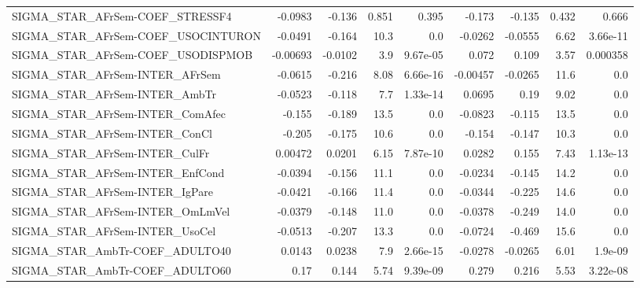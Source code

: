 \begin{tabular}{lrrrrrrrr}
SIGMA\_STAR\_AFrSem-COEF\_STRESSF4       &     -0.0983 &       -0.136 &    0.851 &    0.395 &     -0.173 &      -0.135 &        0.432 &         0.666 \\
SIGMA\_STAR\_AFrSem-COEF\_USOCINTURON    &     -0.0491 &       -0.164 &     10.3 &      0.0 &    -0.0262 &     -0.0555 &         6.62 &      3.66e-11 \\
SIGMA\_STAR\_AFrSem-COEF\_USODISPMOB     &    -0.00693 &      -0.0102 &      3.9 & 9.67e-05 &      0.072 &       0.109 &         3.57 &      0.000358 \\
SIGMA\_STAR\_AFrSem-INTER\_AFrSem        &     -0.0615 &       -0.216 &     8.08 & 6.66e-16 &   -0.00457 &     -0.0265 &         11.6 &           0.0 \\
SIGMA\_STAR\_AFrSem-INTER\_AmbTr         &     -0.0523 &       -0.118 &      7.7 & 1.33e-14 &     0.0695 &        0.19 &         9.02 &           0.0 \\
SIGMA\_STAR\_AFrSem-INTER\_ComAfec       &      -0.155 &       -0.189 &     13.5 &      0.0 &    -0.0823 &      -0.115 &         13.5 &           0.0 \\
SIGMA\_STAR\_AFrSem-INTER\_ConCl         &      -0.205 &       -0.175 &     10.6 &      0.0 &     -0.154 &      -0.147 &         10.3 &           0.0 \\
SIGMA\_STAR\_AFrSem-INTER\_CulFr         &     0.00472 &       0.0201 &     6.15 & 7.87e-10 &     0.0282 &       0.155 &         7.43 &      1.13e-13 \\
SIGMA\_STAR\_AFrSem-INTER\_EnfCond       &     -0.0394 &       -0.156 &     11.1 &      0.0 &    -0.0234 &      -0.145 &         14.2 &           0.0 \\
SIGMA\_STAR\_AFrSem-INTER\_IgPare        &     -0.0421 &       -0.166 &     11.4 &      0.0 &    -0.0344 &      -0.225 &         14.6 &           0.0 \\
SIGMA\_STAR\_AFrSem-INTER\_OmLmVel       &     -0.0379 &       -0.148 &     11.0 &      0.0 &    -0.0378 &      -0.249 &         14.0 &           0.0 \\
SIGMA\_STAR\_AFrSem-INTER\_UsoCel        &     -0.0513 &       -0.207 &     13.3 &      0.0 &    -0.0724 &      -0.469 &         15.6 &           0.0 \\
SIGMA\_STAR\_AmbTr-COEF\_ADULTO40        &      0.0143 &       0.0238 &      7.9 & 2.66e-15 &    -0.0278 &     -0.0265 &         6.01 &       1.9e-09 \\
SIGMA\_STAR\_AmbTr-COEF\_ADULTO60        &        0.17 &        0.144 &     5.74 & 9.39e-09 &      0.279 &       0.216 &         5.53 &      3.22e-08 \\

\end{tabular}
